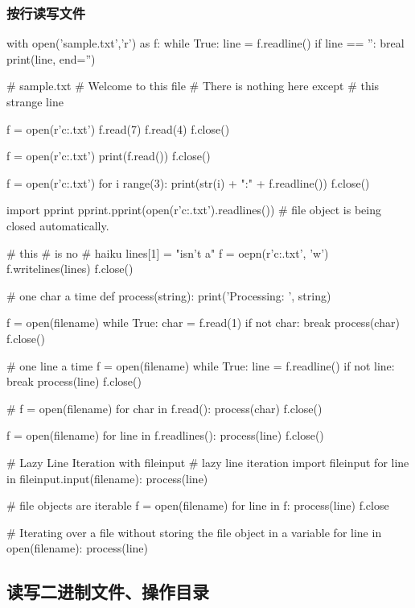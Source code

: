 \subsubsection{按行读写文件}

\begin{python}
with open('sample.txt','r') as f:
    while True:
        line = f.readline()
        if line == '':
            breal
        print(line, end='')


# sample.txt
# Welcome to this file
# There is nothing here except
# this strange line

f = open(r'c:\text\sample.txt')
f.read(7)
f.read(4)
f.close()

f = open(r'c:\text\sample.txt')
print(f.read())
f.close()

f = open(r'c:\text\sample.txt')
for i range(3):
    print(str(i) + ":" + f.readline())
f.close()

import pprint
pprint.pprint(open(r'c:\text\sample.txt').readlines()) # file object is being closed automatically.

# this
# is no
# haiku
lines[1] = "isn't a\n"
f = oepn(r'c:\text\sample.txt', 'w')
f.writelines(lines)
f.close()

# one char a time
def process(string):
    print('Processing: ', string)

f = open(filename)
while True:
   char = f.read(1)
   if not char: 
        break
   process(char)
f.close()

# one line a time
f = open(filename)
while True:
   line = f.readline()
   if not line: 
        break
   process(line)
f.close()

# 
f = open(filename)
for char in f.read():
    process(char)
f.close()

f = open(filename)
for line in f.readlines():
    process(line)
f.close()

# Lazy Line Iteration with fileinput
# lazy line iteration
import fileinput
for line in fileinput.input(filename):
    process(line)

# file objects are iterable
f = open(filename)
for line in f:
    process(line)
f.close

# Iterating over a file without storing the file object in a variable
for line in open(filename):
    process(line)

\end{python}


\subsection{读写二进制文件、操作目录}
